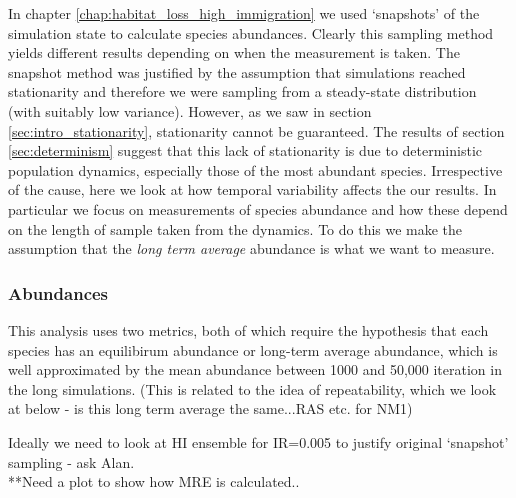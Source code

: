 In chapter \ref{chap:habitat_loss_high_immigration} we used  `snapshots' of the simulation state to calculate species abundances. Clearly this sampling method yields different results depending on when the measurement is taken. The snapshot method was justified by the assumption that simulations reached stationarity and therefore we were sampling from a steady-state distribution (with suitably low variance). However, as we saw in section \ref{sec:intro_stationarity}, stationarity cannot be guaranteed. The results of section \ref{sec:determinism} suggest that this lack of stationarity is due to deterministic population dynamics, especially those of the most abundant species. Irrespective of the cause, here we look at how temporal variability affects the our results. In particular we focus on measurements of species abundance and how these depend on the length of sample taken from the dynamics. To do this we make the assumption that the \emph{long term average} abundance is what we want to measure.

\subsubsection{Abundances}

This analysis uses two metrics, both of which require the hypothesis that each species has an equilibirum abundance or long-term average abundance, which is well approximated by the mean abundance between 1000 and 50,000 iteration in the long simulations. (This is related to the idea of repeatability, which we look at below - is this long term average the same...RAS etc. for NM1)

Ideally we need to look at HI ensemble for IR=0.005 to justify original `snapshot' sampling - ask Alan.\\
**Need a plot to show how MRE is calculated..

